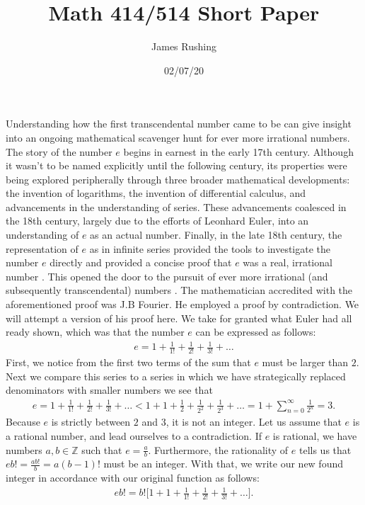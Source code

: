 \documentclass[12pt,oneside]{amsart}
\title{Math 414/514 Short Paper}
\author{James Rushing}
\date{02/07/20}
\theoremstyle{definition}
\theoremstyle{remark}
\numberwithin{equation}{exer}
\begin{document}
\maketitle
\indent Understanding how the first transcendental number came to be can give insight into an ongoing mathematical scavenger hunt for ever more irrational numbers. The story of the number $e$ begins in earnest in the early 17th century. Although it wasn't to be named explicitly until the following century, its properties were being explored peripherally through three broader mathematical developments: the invention of logarithms, the invention of differential calculus, and advancements in the understanding of series. These advancements coalesced in the 18th century, largely due to the efforts of Leonhard Euler, into an understanding of $e$ as an actual number. Finally, in the late 18th century, the representation of $e$ as in infinite series provided the tools to investigate the number $e$ directly and provided a concise proof that $e$ was a real, irrational number \cite{numbere}. This opened the door to the pursuit of ever more irrational (and subsequently transcendental) numbers .  
\newline
\indent The mathematician accredited with the aforementioned proof was J.B Fourier. He employed a proof by contradiction. We will attempt a version of his proof here. We take for granted what Euler had all ready shown, which was that the number $e$ can be expressed as follows:
\begin{align*}
    e =  1 +\frac{1}{1!} +\frac{1}{2!} + \frac{1}{3!}+ \ldots
\end{align*}
First, we notice from the first two terms of the sum that $e$ must be larger than $2$. Next we compare this series to a series in which we have strategically replaced denominators with smaller numbers we see that
\begin{align*}
    e = 1 +\frac{1}{1!} +\frac{1}{2!} + \frac{1}{3!}+ \ldots < 1 + 1 +\frac{1}{2} +\frac{1}{2^2} + \frac{1}{2^3}+ \ldots = 1 + \sum_{n=0}^{\infty}\frac{1}{2^n} =3.
\end{align*}
Because $e$ is strictly between $2$ and $3$, it is not an integer. Let us assume that $e$ is a rational number, and lead ourselves to a contradiction. If $e$ is rational, we have numbers $a,b\in\mathbb{Z}$ such that $e=\frac{a}{b}$. Furthermore, the rationality of $e$ tells us that $eb!=\frac{ab!}{b}=a(b-1)!$ must be an integer. With that, we write our new found integer in accordance with our original function as follows:
\begin{align*}
    eb! = b!\Big[1 + 1 +\frac{1}{1!} +\frac{1}{2!} + \frac{1}{3!}+ \ldots \Big].
\end{align*}
\end{document}
